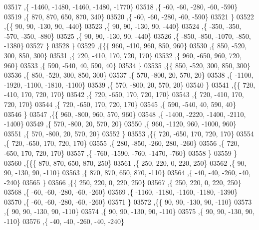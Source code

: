 \begin{DoxyCode}
03517     ,\{ -1460, -1480, -1460, -1480, -1770\}
03518     ,\{   -60,   -60,  -280,   -60,  -590\}
03519     ,\{   870,   870,   650,   870,   340\}
03520     ,\{   -60,   -60,  -280,   -60,  -590\}
03521     \}
03522    ,\{\{    90,    90,  -130,    90,  -440\}
03523     ,\{    90,    90,  -130,    90,  -440\}
03524     ,\{  -350,  -350,  -570,  -350,  -880\}
03525     ,\{    90,    90,  -130,    90,  -440\}
03526     ,\{  -850,  -850, -1070,  -850, -1380\}
03527     \}
03528    \}
03529   ,\{\{\{   960,  -410,   960,   850,   960\}
03530     ,\{   850,  -520,   300,   850,   300\}
03531     ,\{   720,  -410,   170,   720,   170\}
03532     ,\{   960,  -650,   960,   720,   960\}
03533     ,\{   590,  -540,    40,   590,    40\}
03534     \}
03535    ,\{\{   850,  -520,   300,   850,   300\}
03536     ,\{   850,  -520,   300,   850,   300\}
03537     ,\{   570,  -800,    20,   570,    20\}
03538     ,\{ -1100, -1920, -1100, -1810, -1100\}
03539     ,\{   570,  -800,    20,   570,    20\}
03540     \}
03541    ,\{\{   720,  -410,   170,   720,   170\}
03542     ,\{   720,  -650,   170,   720,   170\}
03543     ,\{   720,  -410,   170,   720,   170\}
03544     ,\{   720,  -650,   170,   720,   170\}
03545     ,\{   590,  -540,    40,   590,    40\}
03546     \}
03547    ,\{\{   960,  -800,   960,   570,   960\}
03548     ,\{ -1400, -2220, -1400, -2110, -1400\}
03549     ,\{   570,  -800,    20,   570,    20\}
03550     ,\{   960, -1120,   960, -1000,   960\}
03551     ,\{   570,  -800,    20,   570,    20\}
03552     \}
03553    ,\{\{   720,  -650,   170,   720,   170\}
03554     ,\{   720,  -650,   170,   720,   170\}
03555     ,\{   280,  -850,  -260,   280,  -260\}
03556     ,\{   720,  -650,   170,   720,   170\}
03557     ,\{  -760, -1590,  -760, -1470,  -760\}
03558     \}
03559    \}
03560   ,\{\{\{   870,   870,   650,   870,   250\}
03561     ,\{   250,   220,     0,   220,   250\}
03562     ,\{    90,    90,  -130,    90,  -110\}
03563     ,\{   870,   870,   650,   870,  -110\}
03564     ,\{   -40,   -40,  -260,   -40,  -240\}
03565     \}
03566    ,\{\{   250,   220,     0,   220,   250\}
03567     ,\{   250,   220,     0,   220,   250\}
03568     ,\{   -60,   -60,  -280,   -60,  -260\}
03569     ,\{ -1160, -1180, -1160, -1180, -1390\}
03570     ,\{   -60,   -60,  -280,   -60,  -260\}
03571     \}
03572    ,\{\{    90,    90,  -130,    90,  -110\}
03573     ,\{    90,    90,  -130,    90,  -110\}
03574     ,\{    90,    90,  -130,    90,  -110\}
03575     ,\{    90,    90,  -130,    90,  -110\}
03576     ,\{   -40,   -40,  -260,   -40,  -240\}

\end{DoxyCode}
